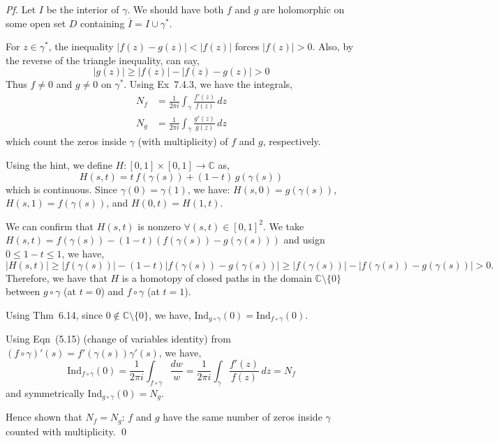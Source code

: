 \documentclass[a4paper]{article}
\begin{document}
\textit{Pf.} Let $I$ be the interior of $\gamma$. We should have both $f$ and $g$ are holomorphic on
some open set $D$ containing $\overline{I} = I \cup \gamma^*$.

\medskip
For $z \in \gamma^*$, the inequality
$|f(z) - g(z)| < |f(z)|$ forces $|f(z)| > 0$. Also, by the reverse of the triangle inequality, can say,
\[
|g(z)| \geq |f(z)| - |f(z) - g(z)| > 0
\]
Thus $f \neq 0$ and $g \neq 0$ on $\gamma^*$. Using Ex~7.4.3, we have the integrals,
\begin{align*}
N_f &= \frac{1}{2\pi i}\int_\gamma \frac{f'(z)}{f(z)}\,dz \\
N_g &= \frac{1}{2\pi i}\int_\gamma \frac{g'(z)}{g(z)}\,dz
\end{align*}
which count the zeros inside $\gamma$ (with multiplicity) of $f$ and $g$, respectively.

\medskip
Using the hint, we define $H : [0,1] \times [0,1] \to \mathbb{C}$ as,
\[
H(s, t) = t\, f(\gamma(s)) + (1 - t)\, g(\gamma(s))
\]
which is continuous. Since $\gamma(0) = \gamma(1)$, we have: $H(s, 0) = g(\gamma(s))$, $H(s, 1) = f(\gamma(s))$, and
$H(0, t) = H(1, t)$. 

We can confirm that $H(s, t)$ is nonzero
$\forall(s, t) \in [0,1]^2$. We take $H(s, t) = f(\gamma(s)) - (1-t)(f(\gamma(s)) - g(\gamma(s)))$ and usign $0 \leq 1 - t \leq 1$, we have,
\[
|H(s, t)| \geq |f(\gamma(s))| - (1-t)|f(\gamma(s)) - g(\gamma(s))|
\geq |f(\gamma(s))| - |f(\gamma(s)) - g(\gamma(s))| > 0.
\]
Therefore, we have that $H$ is a homotopy of closed paths in the domain $\mathbb{C} \setminus \{0\}$ between
$g \circ \gamma$ (at $t = 0$) and $f \circ \gamma$ (at $t = 1$).

\medskip
Using Thm~6.14, since $0 \notin \mathbb{C} \setminus \{0\}$, we have, $\displaystyle \mathrm{Ind}_{g \circ \gamma}(0) = \mathrm{Ind}_{f \circ \gamma}(0)$.

\medskip
Using Eqn~(5.15) (change of variables identity) from $(f \circ \gamma)'(s) = f'(\gamma(s))\gamma'(s)$, we have,
\[
\mathrm{Ind}_{f \circ \gamma}(0)
= \frac{1}{2\pi i}\int_{f \circ \gamma} \frac{dw}{w}
= \frac{1}{2\pi i}\int_\gamma \frac{f'(z)}{f(z)}\,dz
= N_f
\]
and symmetrically $\mathrm{Ind}_{g \circ \gamma}(0) = N_g$.

\medskip
Hence shown that $N_f = N_g$: $f$ and $g$ have the same number of zeros inside $\gamma$ counted
with multiplicity. \qed

\end{document}
